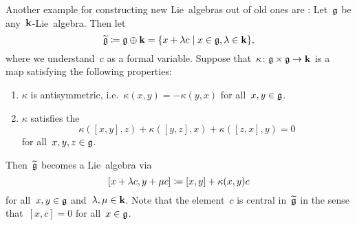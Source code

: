  
\begin{example}
  Another example for constructing new Lie~algebras out of old ones are :
  Let~$\mathfrak{g}$ be any~$\kf$-Lie~algebra.
  Then let
  \[
    \widetilde{\glie}
    \defined
    \glie \oplus \kf
    =
    \{
      x + \lambda c
    \suchthat
      x \in \glie,
      \lambda \in \kf
    \},
  \]
  where we understand~$c$ as a formal variable.
  Suppose that~$\kappa \colon \mathfrak{g} \times \mathfrak{g} \to \mathbf{k}$ is a~{\bilinear{$\kf$}} map satisfying the following properties:
  \begin{enumerate}
  \item
    $\kappa$ is antisymmetric, i.e.~$\kappa(x,y) = -\kappa(y,x)$ for all~$x,y \in \mathfrak{g}$.
  \item
    $\kappa$ satisfies the 
    \[
      \kappa([x,y],z) + \kappa([y,z],x) + \kappa([z,x],y) = 0
    \]
    for all~$x, y, z \in \mathfrak{g}$.
  \end{enumerate}
  Then~$\widetilde{\mathfrak{g}}$ becomes a Lie~algebra via
  \[
    [x + \lambda c, y + \mu c]
    \coloneqq
    [x,y] + \kappa(x,y) c
  \]
  for all~$x, y \in \mathfrak{g}$ and~$\lambda, \mu \in \mathbf{k}$.
  Note that the element~$c$ is central in~$\widetilde{\mathfrak{g}}$ in the sense that~$[x,c] = 0$ for all~$x \in \mathfrak{g}$.
  

\end{example}
